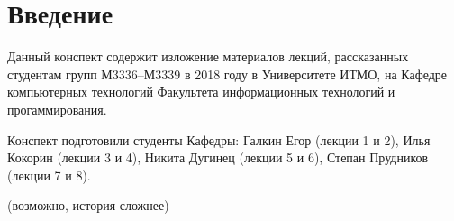 \section{Введение}

Данный конспект содержит изложение материалов лекций, рассказанных студентам групп М3336--М3339 
в 2018 году в Университете ИТМО, на Кафедре компьютерных технологий Факультета информационных технологий и прогаммирования.

Конспект подготовили студенты Кафедры: Галкин Егор (лекции 1 и 2),
Илья Кокорин (лекции 3 и 4), Никита Дугинец (лекции 5 и 6), Степан Прудников (лекции 7 и 8).

(возможно, история сложнее)